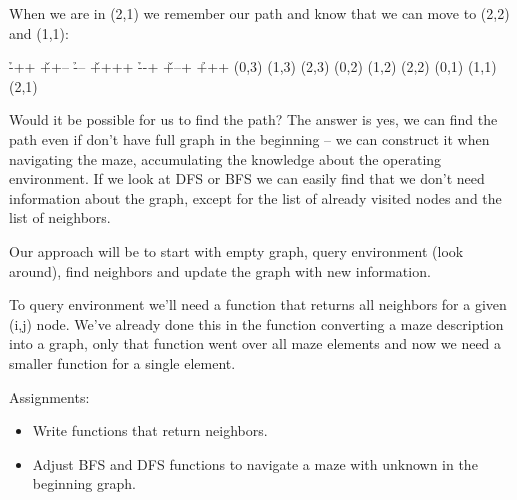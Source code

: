 When we are in (2,1) we remember our path and know that we can 
move to (2,2) and (1,1):

\begin{labyrinth}{3}{4}
        \h -++
\v ++-- \h ---
\v ++++ \h --+
\v +--+ \h +++
\putsymbol(0,3){}
\putsymbol(1,3){}
\putsymbol(2,3){}
\putsymbol(0,2){}
\putsymbol(1,2){}
\putsymbol(2,2){}
\putsymbol(0,1){}
\putsymbol(1,1){}
\putsymbol(2,1){}
\end{labyrinth}


Would it be possible for us to find the path? The answer
is yes, we can find the path even if don't have full graph
in the beginning -- we can construct it when navigating the
maze, accumulating the knowledge about the operating environment.
If we look at DFS or BFS we can easily find that we don't
need information about the graph, except for the list of
already visited nodes and the list of neighbors.

Our approach will be to start with empty graph,
query environment (look around),
find neighbors and update the graph with new information.

To query environment we'll need a function that returns
all neighbors for a given (i,j) node. We've already done
this in the function converting a maze description into
a graph, only that function went over all maze elements
and now we need a smaller function for a single element.

\begin{tcolorbox}
Assignments:
\begin{itemize}
\item Write functions that return neighbors.
\item Adjust BFS and DFS functions to navigate a maze
with unknown in the beginning graph.
\end{itemize}
\end{tcolorbox}

